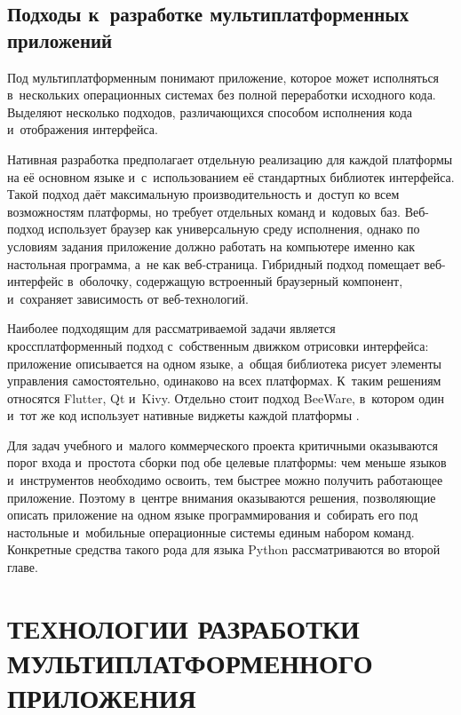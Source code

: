 \documentclass[14pt,a4paper]{extarticle}
\begin{document}
\subsection{Подходы к~разработке мультиплатформенных приложений}

Под мультиплатформенным понимают приложение, которое может исполняться в~нескольких операционных системах без полной переработки исходного кода. Выделяют несколько подходов, различающихся способом исполнения кода и~отображения интерфейса.



Нативная разработка предполагает отдельную реализацию для каждой платформы на её основном языке и~с~использованием её стандартных библиотек интерфейса. Такой подход даёт максимальную производительность и~доступ ко всем возможностям платформы, но требует отдельных команд и~кодовых баз. Веб-подход использует браузер как универсальную среду исполнения, однако по условиям задания приложение должно работать на компьютере именно как настольная программа, а~не как веб-страница. Гибридный подход помещает веб-интерфейс в~оболочку, содержащую встроенный браузерный компонент, и~сохраняет зависимость от веб-технологий.



Наиболее подходящим для рассматриваемой задачи является кроссплатформенный подход с~собственным движком отрисовки интерфейса: приложение описывается на одном языке, а~общая библиотека рисует элементы управления самостоятельно, одинаково на всех платформах. К~таким решениям относятся Flutter, Qt и~Kivy. Отдельно стоит подход BeeWare, в~котором один и~тот же код использует нативные виджеты каждой платформы \cite{b2}.



Для задач учебного и~малого коммерческого проекта критичными оказываются порог входа и~простота сборки под обе целевые платформы: чем меньше языков и~инструментов необходимо освоить, тем быстрее можно получить работающее приложение. Поэтому в~центре внимания оказываются решения, позволяющие описать приложение на одном языке программирования и~собирать его под настольные и~мобильные операционные системы единым набором команд. Конкретные средства такого рода для языка Python рассматриваются во второй главе.



\clearpage

\section{ТЕХНОЛОГИИ РАЗРАБОТКИ МУЛЬТИПЛАТФОРМЕННОГО ПРИЛОЖЕНИЯ}
\end{document}
